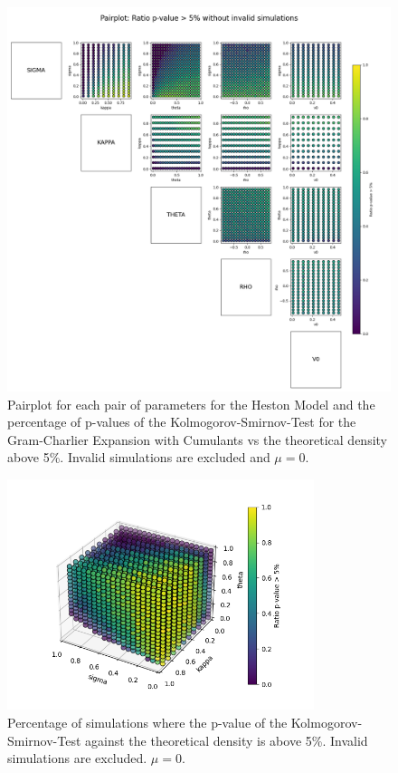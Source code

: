 \begin{figure}
    \centering
    \includegraphics[width=\textwidth]{img/pairplot_GC_cum_KS_muzero.png}
    \caption{Pairplot for each pair of parameters for the Heston Model and the percentage of p-values of the Kolmogorov-Smirnov-Test for the Gram-Charlier Expansion with Cumulants vs the theoretical density above 5\%. Invalid simulations are excluded and $\mu=0$.}
    \label{fig:pairplot_GC_cum_KS_muzero}
\end{figure}

\begin{figure}
    \centering
    \includegraphics[width=0.8\textwidth]{img/GC_cum_KS_3d_p_value_sigma_kappa_theta_muzero.png}
    \caption{Percentage of simulations where the p-value of the Kolmogorov-Smirnov-Test against the theoretical density is above 5\%. Invalid simulations are excluded. $\mu=0$.}
    \label{fig:GC_cum_KS_3d_p_value_sigma_kappa_theta_muzero}
\end{figure}

